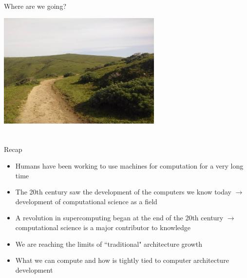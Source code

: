 \documentclass[xcolor=x11names,compress]{beamer}
\renewcommand{\(}{\begin{columns}}
\renewcommand{\)}{\end{columns}}
\newcommand{\<}[1]{\begin{column}{#1}}
\renewcommand{\>}{\end{column}}
\begin{document}
\begin{frame}{Where are we going?}
\begin{center}
\includegraphics[height=2.25in]{../figs/road}
\end{center}
\end{frame}

\section*{}
\begin{frame}{Recap}
\begin{itemize}
\item Humans have been working to use machines for computation for a very long time\vspace*{0.5 em}
\item The 20th century saw the development of the computers we know today $\rightarrow$ development of computational science as a field\vspace*{0.5 em}
\item A revolution in supercomputing began at the end of the 20th century $\rightarrow$ \alert{computational science is a major contributor to knowledge}\vspace*{0.5 em}
\item We are reaching the limits of ``traditional" architecture growth\vspace*{0.5 em}
\item What we can compute and how is tightly tied to computer architecture development
\end{itemize}
\end{frame}
\end{document}
